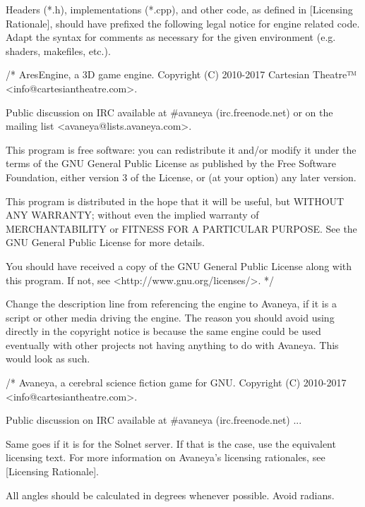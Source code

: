 Headers (*.h), implementations (*.cpp), and other code, as defined in [Licensing Rationale], should have prefixed the following legal notice for engine related code. Adapt the syntax for comments as necessary for the given environment (e.g. shaders, makefiles, etc.).

\startCodeExample
/*
    AresEngine, a 3D game engine.
    Copyright (C) 2010-2017 Cartesian Theatre™ <info@cartesiantheatre.com>.

    Public discussion on IRC available at #avaneya (irc.freenode.net)
    or on the mailing list <avaneya@lists.avaneya.com>.

    This program is free software: you can redistribute it and/or modify
    it under the terms of the GNU General Public License as published by
    the Free Software Foundation, either version 3 of the License, or
    (at your option) any later version.

    This program is distributed in the hope that it will be useful,
    but WITHOUT ANY WARRANTY; without even the implied warranty of
    MERCHANTABILITY or FITNESS FOR A PARTICULAR PURPOSE.  See the
    GNU General Public License for more details.

    You should have received a copy of the GNU General Public License
    along with this program.  If not, see <http://www.gnu.org/licenses/>.
*/
\stopCodeExample

Change the description line from referencing the engine to Avaneya, if it is a script or other media driving the engine. The reason you should avoid using  directly in the copyright notice is because the same engine could be used eventually with other projects not having anything to do with Avaneya. This would look as such.

\startCodeExample
/*
    Avaneya, a cerebral science fiction game for GNU.
    Copyright (C) 2010-2017 <info@cartesiantheatre.com>.

    Public discussion on IRC available at #avaneya (irc.freenode.net)
    ...
\stopCodeExample

Same goes if it is for the Solnet server. If that is the case, use the equivalent licensing text. For more information on Avaneya's licensing rationales, see [Licensing Rationale].


\startitemize[4]
\item
All angles should be calculated in degrees whenever possible. Avoid radians.

